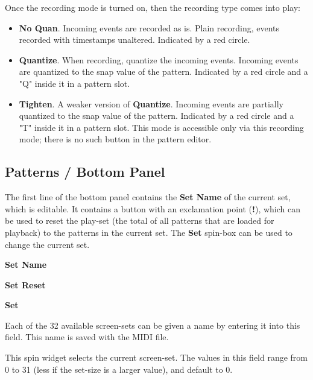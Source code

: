    Once the recording mode is turned on, then the recording type comes into
   play:

   \begin{itemize}
      \item \textbf{No Quan}.
         Incoming events are recorded as is.
         Plain recording, events recorded with timestamps unaltered.
         Indicated by a red circle.
      \item \textbf{Quantize}.
         When recording, quantize the incoming events.
         Incoming events are quantized to the snap value of the pattern.
         Indicated by a red circle and a "Q" inside it in a pattern slot.
      \item \textbf{Tighten}.
         A weaker version of \textbf{Quantize}.
         Incoming events are partially quantized to the snap value of the
         pattern.
         Indicated by a red circle and a "T" inside it in a pattern slot.
         This mode is accessible only via this recording mode; there
         is no such button in the pattern editor.
   \end{itemize}

\subsection{Patterns / Bottom Panel}
\label{subsec:patterns_panel_bottom}

   The first line of the bottom panel contains the \textbf{Set Name}
   of the current set, which is editable.
   It contains a button with an exclamation point (\textbf{!}), which
   can be used to reset the play-set (the total of all patterns that are loaded
   for playback) to the patterns in the current set.
   The \textbf{Set} spin-box can be used to change the current set.

   \begin{enumber}
      \item \textbf{Set Name}
      \item \textbf{Set Reset}
      \item \textbf{Set}
   \end{enumber}

   \setcounter{ItemCounter}{0}      %

   Each of the 32 available screen-sets can be given a name by entering it
   into this field.  This name is saved with the MIDI file.

   This spin widget selects the current screen-set.  The values in this
   field range from 0 to 31 (less if the set-size is a larger value),
   and default to 0.

